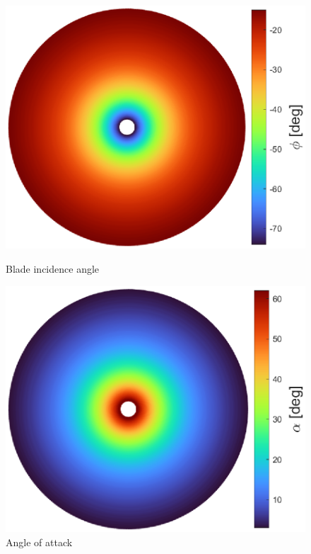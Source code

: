 {\begin{figure}[!htb]
    \centering
    \begin{minipage}{0.49\textwidth}
        \centering
        \includegraphics[width=\textwidth]{Figures/comp_method/sim_B/phi.eps}
        \caption{Blade incidence angle}
        \label{fig:blade_incidence_angle_paper}
    \end{minipage}%
    \hfill
    \begin{minipage}{0.49\textwidth}
        \centering
        \includegraphics[width=\textwidth]{Figures/comp_method/sim_B/alpha.eps}
        \caption{Angle of attack}
        \label{fig:angle_of_attack_paper}
    \end{minipage}
\end{figure}

}
